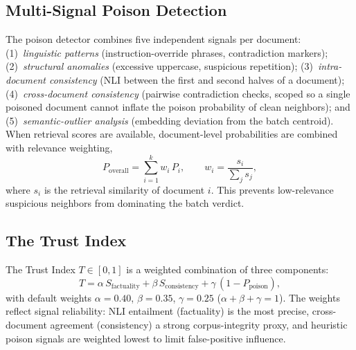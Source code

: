 \documentclass[conference]{IEEEtran}
\begin{document}
\subsection{Multi-Signal Poison Detection}
The poison detector combines five independent signals per document:
(1)~\emph{linguistic patterns} (instruction-override phrases, contradiction
markers); (2)~\emph{structural anomalies} (excessive uppercase, suspicious
repetition); (3)~\emph{intra-document consistency} (NLI between the first and
second halves of a document); (4)~\emph{cross-document consistency} (pairwise
contradiction checks, scoped so a single poisoned document cannot inflate the
poison probability of clean neighbors); and (5)~\emph{semantic-outlier analysis}
(embedding deviation from the batch centroid). When retrieval scores are
available, document-level probabilities are combined with relevance weighting,
\begin{equation}
P_{\text{overall}} = \sum_{i=1}^{k} w_i\,P_i,
\qquad w_i = \frac{s_i}{\sum_j s_j},
\end{equation}
where $s_i$ is the retrieval similarity of document $i$. This prevents
low-relevance suspicious neighbors from dominating the batch verdict.

\subsection{The Trust Index}
The Trust Index $T\in[0,1]$ is a weighted combination of three components:
\begin{equation}
\label{eq:trust}
T = \alpha\,S_{\text{factuality}} + \beta\,S_{\text{consistency}}
    + \gamma\,(1 - P_{\text{poison}}),
\end{equation}
with default weights $\alpha{=}0.40$, $\beta{=}0.35$, $\gamma{=}0.25$
($\alpha{+}\beta{+}\gamma{=}1$). The weights reflect signal reliability:
NLI entailment (factuality) is the most precise, cross-document agreement
(consistency) a strong corpus-integrity proxy, and heuristic poison signals are
weighted lowest to limit false-positive influence.
\end{document}
